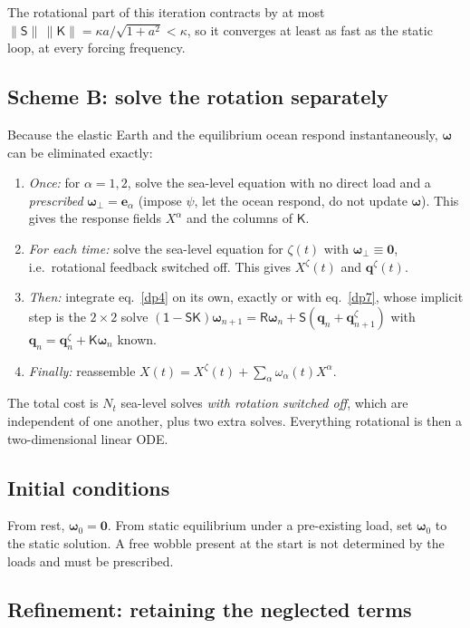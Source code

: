 \documentclass[11pt,a4paper]{article}
\newcommand{\bw}{\bm{\omega}}
\newcommand{\bq}{\mathbf{q}}
\newcommand{\Id}{\mathsf{1}}
\newcommand{\R}{\mathsf{R}}
\newcommand{\Sm}{\mathsf{S}}
\newcommand{\K}{\mathsf{K}}
\begin{document}
The rotational part of this iteration contracts by at most $\|\Sm\|\,\|\K\|=\kappa a/\sqrt{1+a^2}<\kappa$,
so it converges at least as fast as the static loop, at every forcing frequency.

\subsection{Scheme B: solve the rotation separately}
\label{sec:schemeB}

Because the elastic Earth and the equilibrium ocean respond instantaneously, $\bw$ can be eliminated
exactly:
\begin{enumerate}
  \item \emph{Once:} for $\alpha=1,2$, solve the sea-level equation with no direct load and a
  \emph{prescribed} $\bw_\perp=\mathbf{e}_\alpha$ (impose $\psi$, let the ocean respond, do not
  update $\bw$). This gives the response fields $X^\alpha$ and the columns of $\K$.
  \item \emph{For each time:} solve the sea-level equation for $\zeta(t)$ with
  $\bw_\perp\equiv\mathbf{0}$, i.e.\ rotational feedback switched off. This gives $X^\zeta(t)$ and
  $\bq^\zeta(t)$.
  \item \emph{Then:} integrate eq.~\eqref{dp4} on its own, exactly or with eq.~\eqref{dp7}, whose
  implicit step is the $2\times2$ solve
  $(\Id-\Sm\K)\bw_{n+1}=\R\bw_n+\Sm(\bq_n+\bq^\zeta_{n+1})$ with $\bq_n=\bq^\zeta_n+\K\bw_n$ known.
  \item \emph{Finally:} reassemble $X(t)=X^\zeta(t)+\sum_\alpha\omega_\alpha(t)X^\alpha$.
\end{enumerate}
The total cost is $N_t$ sea-level solves \emph{with rotation switched off}, which are independent of
one another, plus two extra solves. Everything rotational is then a two-dimensional linear ODE.

\subsection{Initial conditions}

From rest, $\bw_0=\mathbf{0}$. From static equilibrium under a pre-existing load, set $\bw_0$ to the
static solution. A free wobble present at the start is not determined by the loads and must be
prescribed.

\subsection{Refinement: retaining the neglected terms}
\label{sec:jdot}
\end{document}
